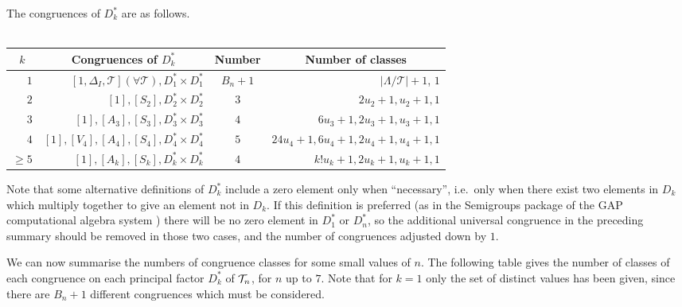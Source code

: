 \begin{theorem}
The congruences of $D_k^*$ are as follows.
\\ \\
  \begin{tabular}{| r | r | c | r |}
    \hline
    \multicolumn{1}{|c|}{$k$} & \multicolumn{1}{|c|}{\textbf{Congruences of $D_k^*$}} & \textbf{Number} & \multicolumn{1}{|c|}{\textbf{Number of classes}} \\
    \hline
    $1$ & $[1, \Delta_I, \mathcal{T}] (\forall \mathcal{T}), D_1^* \times D_1^*$ & $B_n + 1$
    & $|\Lambda/\mathcal{T}|+1$, $1$ \\
    $2$ & $[1], [S_2], D_2^* \times D_2^*$ & $3$ & $2u_2+1, u_2+1, 1$ \\
    $3$ & $[1], [A_3], [S_3], D_3^* \times D_3^*$ & $4$ & $6u_3+1, 2u_3+1, u_3+1, 1$ \\
    $4$ & $[1], [V_4], [A_4], [S_4], D_4^* \times D_4^*$ & $5$ & $24u_4+1, 6u_4+1, 2u_4+1, u_4+1, 1$ \\
    $\geq 5$ & $[1], [A_k], [S_k], D_k^* \times D_k^*$ & $4$ & $k!u_k+1, 2u_k+1, u_k+1, 1$ \\
    \hline
  \end{tabular}
\end{theorem}

Note that some alternative definitions of $D_k^*$ include a zero element only
when ``necessary'', i.e.~only when there exist two elements in $D_k$ which multiply together to
give an element not in $D_k$.  If this definition is preferred (as in the
Semigroups package \cite{semigroups} of the GAP computational algebra
system \cite{gap}) there will be no zero element in $D_1^*$ or $D_n^*$, so the
additional universal congruence in the preceding summary should be removed in
those two cases, and the number of congruences adjusted down by $1$.

We can now summarise the numbers of congruence classes for some small values of
$n$.  The following table gives the number of classes of each congruence on each
principal factor $D_k^*$ of $\mathcal{T}_n$, for $n$ up to $7$.  Note that for $k=1$ only
the set of distinct values has been given, since there are $B_n+1$ different
congruences which must be considered.


